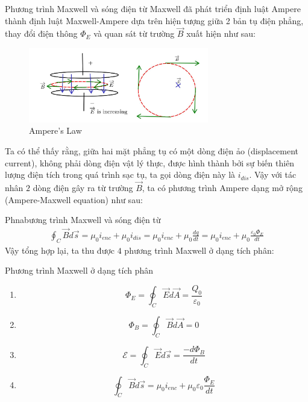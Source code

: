 \documentclass[8pt]{beamer}
\begin{document}
\begin{frame}{Phương trình Maxwell và sóng điện từ}
	Maxwell đã phát triển định luật Ampere thành định luật Maxwell-Ampere dựa trên hiện tượng giữa 2 bản tụ điện phẳng, thay đổi điện thông $\Phi_{E}$ và quan sát từ trường $\overrightarrow{B}$ xuất hiện như sau:
\begin{figure}[h]
	\includegraphics[width=0.7\textwidth]{maxwell.jpg}
			\caption{Ampere's Law}\label{fig:re9}
		\end{figure}
		Ta có thể thấy rằng, giữa hai mặt phẳng tụ có một dòng điện ảo (displacement current), không phải dòng điện vật lý thực, được hình thành bởi sự biến thiên lượng điện tích trong quá trình sạc tụ, ta gọi dòng điện này là $i_{dis}$. Vậy với tác nhân $2$ dòng điện gây ra từ trường $\overrightarrow{B}$, ta có phương trình Ampere dạng mở rộng (Ampere-Maxwell equation) như sau:
\end{frame}
\begin{frame}{Phnabương trình Maxwell và sóng điện từ}
\begin{equation*}
\begin{split}
	\oint_{C}\overrightarrow{B}d\overrightarrow{s}=\mu_{0} i_{enc}+\mu_{0}i_{dis}=\mu_{0}i_{enc}+\mu_{0}\frac{dq}{dt}=\mu_{0}i_{enc}+\mu_{0}\frac{\varepsilon_{0}\Phi_{E}}{dt}
\end{split}
\end{equation*}
 Vậy tổng hợp lại, ta thu được $4$ phương trình Maxwell ở dạng tích phân:
 \begin{block}{Phương trình Maxwell ở dạng tích phân}
\begin{enumerate}
	\item $$\Phi_{E}=\oint_{C}\overrightarrow{E}d\overrightarrow{A}=\frac{Q_{0}}{\varepsilon_{0}}$$
	\item $$ \Phi_{B}=\oint_{C}\overrightarrow{B}d\overrightarrow{A}=0$$
	\item $$\mathscr{E}=\oint_{C}\overrightarrow{E}d\overrightarrow{s}=\frac{-d\Phi_{B}}{dt}$$
	\item $$\oint_{C}\overrightarrow{B}d\overrightarrow{s}=\mu_{0}i_{enc}+\mu_{0}\varepsilon_{0}\frac{\Phi_{E}}{dt}$$
\end{enumerate}
\end{block}
\end{frame}
\end{document}
